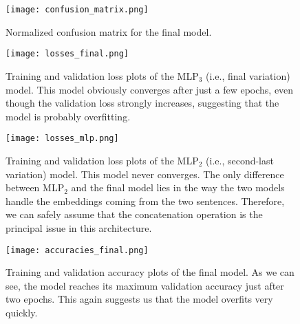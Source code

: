 \documentclass[11pt,a4paper]{article}
\begin{document}
	\begin{figure}[H]
		\centering
		\texttt{[image: confusion\_matrix.png]}
		\caption{Normalized confusion matrix for the final model.}
		\label{fig:confusionmatrix}
	\end{figure}

	\begin{figure}[H]
		\centering
		\texttt{[image: losses\_final.png]}
		\caption{Training and validation loss plots of the MLP$_3$ (i.e., final variation) model. This model obviously converges after just a few epochs, even though the validation loss strongly increases, suggesting that the model is probably overfitting.}
		\label{fig:losses_final}
	\end{figure}

	\begin{figure}[H]
		\centering
		\texttt{[image: losses\_mlp.png]}
		\caption{Training and validation loss plots of the MLP$_2$ (i.e., second-last variation) model. This model never converges. The only difference between MLP$_2$ and the final model lies in the way the two models handle the embeddings coming from the two sentences. Therefore, we can safely assume that the concatenation operation is the principal issue in this architecture.}
		\label{fig:losses_mlp}
	\end{figure}

	\begin{figure}[H]
		\centering
		\texttt{[image: accuracies\_final.png]}
		\caption{Training and validation accuracy plots of the final model. As we can see, the model reaches its maximum validation accuracy just after two epochs. This again suggests us that the model overfits very quickly.}
		\label{fig:accuracies_final}
	\end{figure}
	
	
	
	
	
	
	
\end{document}
